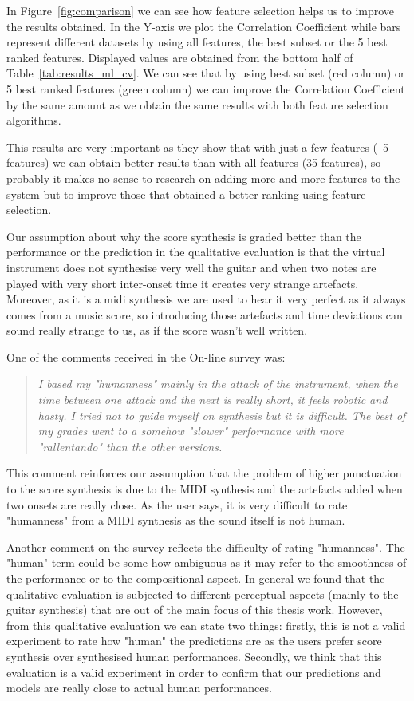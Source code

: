 In Figure~\ref{fig:comparison} we can see how feature selection helps us to improve the results obtained. In the Y-axis we plot the Correlation Coefficient while bars represent different datasets by using all features, the best subset or the 5 best ranked features. Displayed values are obtained from the bottom half of Table~\ref{tab:results_ml_cv}. We can see that by using best subset (red column) or 5 best ranked features (green column) we can improve the Correlation Coefficient by the same amount as we obtain the same results with both feature selection algorithms.


This results are very important as they show that with just a few features (~5 features) we can obtain better results than with all features (35 features), so probably it makes no sense to research on adding more and more features to the system but to improve those that obtained a better ranking using feature selection.

Our assumption about why the score synthesis is graded better than the performance or the prediction in the qualitative evaluation is that the virtual instrument does not synthesise very well the guitar and when two notes are played with very short inter-onset time it creates very strange artefacts. Moreover, as it is a midi synthesis we are used to hear it very perfect as it always comes from a music score, so introducing those artefacts and time deviations can sound really strange to us, as if the score wasn't well written.

One of the comments received in the On-line survey was: 
\begin{quote}
\textit{I based my "humanness" mainly in the attack of the instrument, when the time between one attack and the next is really short, it feels robotic and hasty. I tried not to guide myself on synthesis but it is difficult. The best of my grades went to a somehow "slower" performance with more "rallentando" than the other versions.} 
\end{quote}

This comment reinforces our assumption that the problem of higher punctuation to the score synthesis is due to the MIDI synthesis and the artefacts added when two onsets are really close. As the user says, it is very difficult to rate "humanness" from a MIDI synthesis as the sound itself is not human. 

Another comment on the survey reflects the difficulty of rating "humanness".  The "human" term could be some how ambiguous as it may refer to the smoothness of the performance or to the compositional aspect. In general we found that the qualitative evaluation is subjected to different perceptual aspects (mainly to the guitar synthesis) that are out of the main focus of this thesis work.  However, from this qualitative evaluation we can state two things: firstly, this is not a valid experiment to rate how "human" the predictions are as the users prefer score synthesis over synthesised human performances. Secondly, we think that this evaluation is a valid experiment in order to confirm that our predictions and models are really close to actual human performances. 



\cleardoublepage


